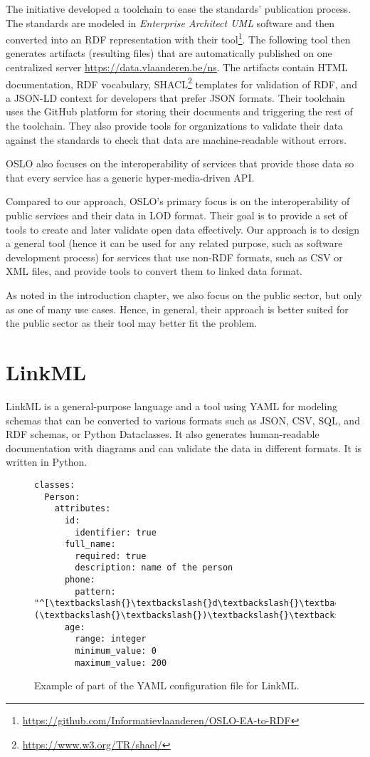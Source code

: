 The initiative developed a toolchain to ease the standards' publication process. The standards are modeled in \textit{Enterprise Architect UML} software and then converted into an RDF representation with their tool\footnote{\url{https://github.com/Informatievlaanderen/OSLO-EA-to-RDF}}. The following tool then generates artifacts (resulting files) that are automatically published on one centralized server \url{https://data.vlaanderen.be/ns}. The artifacts contain HTML documentation, RDF vocabulary, SHACL\footnote{\url{https://www.w3.org/TR/shacl/}} templates for validation of RDF, and a JSON-LD context for developers that prefer JSON formats. Their toolchain uses the GitHub platform for storing their documents and triggering the rest of the toolchain. They also provide tools for organizations to validate their data against the standards to check that data are machine-readable without errors.

OSLO also focuses on the interoperability of services that provide those data so that every service has a generic hyper-media-driven API.

\medskip

Compared to our approach, OSLO's primary focus is on the interoperability of public services and their data in LOD format. Their goal is to provide a set of tools to create and later validate open data effectively. Our approach is to design a general tool (hence it can be used for any related purpose, such as software development process) for services that use non-RDF formats, such as CSV or XML files, and provide tools to convert them to linked data format.

As noted in the introduction chapter, we also focus on the public sector, but only as one of many use cases. Hence, in general, their approach is better suited for the public sector as their tool may better fit the problem.

\section{LinkML}

LinkML is a general-purpose language and a tool using YAML for modeling schemas that can be converted to various formats such as JSON, CSV, SQL, and RDF schemas, or Python Dataclasses. It also generates human-readable documentation with diagrams and can validate the data in different formats. It is written in Python.

\begin{figure}[h!]\centering
    \begin{Verbatim}[commandchars=\\\{\}]
classes:
  Person:
    attributes:
      id:
        identifier: true
      full_name:
        required: true
        description: name of the person
      phone:
        pattern: "^[\textbackslash{}\textbackslash{}d\textbackslash{}\textbackslash{}(\textbackslash{}\textbackslash{})\textbackslash{}\textbackslash{}-]+$"
      age:
        range: integer
        minimum_value: 0
        maximum_value: 200
    \end{Verbatim}
    \caption{Example of part of the YAML configuration file for LinkML.}
\end{figure}

